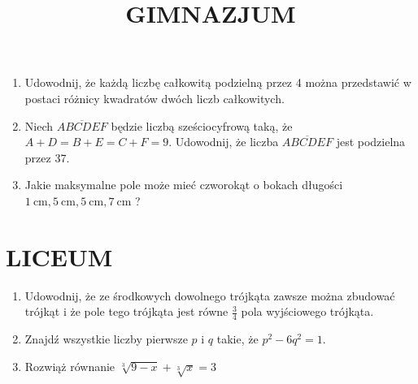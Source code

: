 \documentclass[10pt]{article}
\title{GIMNAZJUM }
\author{}
\date{}
\begin{document}
\maketitle
\begin{enumerate}
  \item Udowodnij, że każdą liczbę całkowitą podzielną przez 4 można przedstawić w postaci różnicy kwadratów dwóch liczb całkowitych.
  \item Niech \(\overline{A B C D E F}\) będzie liczbą sześciocyfrową taką, że \(A+D=B+E=C+F=9\). Udowodnij, że liczba \(\overline{A B C D E F}\) jest podzielna przez 37.
  \item Jakie maksymalne pole może mieć czworokąt o bokach długości \(1 \mathrm{~cm}, 5 \mathrm{~cm}, 5 \mathrm{~cm}, 7 \mathrm{~cm}\) ?
\end{enumerate}

\section*{LICEUM}
\begin{enumerate}
  \item Udowodnij, że ze środkowych dowolnego trójkąta zawsze można zbudować trójkąt i że pole tego trójkąta jest równe \(\frac{3}{4}\) pola wyjściowego trójkąta.
  \item Znajdź wszystkie liczby pierwsze \(p\) i \(q\) takie, że \(p^{2}-6 q^{2}=1\).
  \item Rozwiąż równanie \(\sqrt[3]{9-x}+\sqrt[3]{x}=3\)
\end{enumerate}
\end{document}
